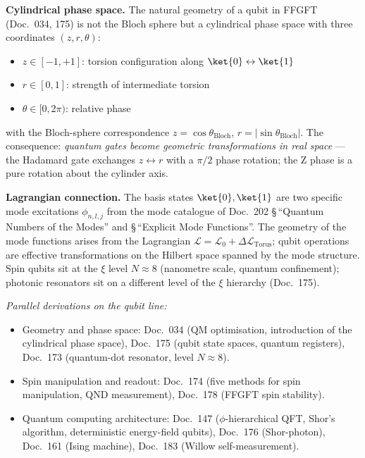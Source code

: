 \textbf{Cylindrical phase space.} The natural geometry of a qubit in
FFGFT (Doc.~034, 175) is not the Bloch sphere but a cylindrical
phase space with three coordinates $(z, r, \theta)$:
\begin{itemize}\setlength\itemsep{0pt}
  \item $z \in [-1, +1]$: torsion configuration along
        $\ket{0} \leftrightarrow \ket{1}$
  \item $r \in [0, 1]$: strength of intermediate torsion
  \item $\theta \in [0, 2\pi)$: relative phase
\end{itemize}
with the Bloch-sphere correspondence $z = \cos\theta_{\text{Bloch}}$,
$r = |\sin\theta_{\text{Bloch}}|$. The consequence: \emph{quantum
gates become geometric transformations in real space} --- the Hadamard
gate exchanges $z \leftrightarrow r$ with a $\pi/2$ phase rotation;
the Z phase is a pure rotation about the cylinder axis.

\textbf{Lagrangian connection.} The basis states $\ket{0}, \ket{1}$
are two specific mode excitations $\phi_{n,l,j}$ from the mode
catalogue of Doc.~202 \S\,\enquote{Quantum Numbers of the Modes}
and \S\,\enquote{Explicit Mode Functions}. The geometry of the mode
functions arises from the Lagrangian
$\mathcal{L} = \mathcal{L}_0 + \Delta\mathcal{L}_{\text{Torus}}$;
qubit operations are effective transformations on the Hilbert space
spanned by the mode structure. Spin qubits sit at the $\xi$ level
$N \approx 8$ (nanometre scale, quantum confinement); photonic
resonators sit on a different level of the $\xi$ hierarchy
(Doc.~175).

\textit{Parallel derivations on the qubit line:}
\begin{itemize}\setlength\itemsep{0pt}
  \item Geometry and phase space:
        Doc.~034 (QM optimisation, introduction of the cylindrical
        phase space),
        Doc.~175 (qubit state spaces, quantum registers),
        Doc.~173 (quantum-dot resonator, level $N \approx 8$).
  \item Spin manipulation and readout:
        Doc.~174 (five methods for spin manipulation, QND
        measurement),
        Doc.~178 (FFGFT spin stability).
  \item Quantum computing architecture:
        Doc.~147 ($\phi$-hierarchical QFT, Shor's algorithm,
        deterministic energy-field qubits),
        Doc.~176 (Shor-photon),
        Doc.~161 (Ising machine),
        Doc.~183 (Willow self-measurement).
\end{itemize}

